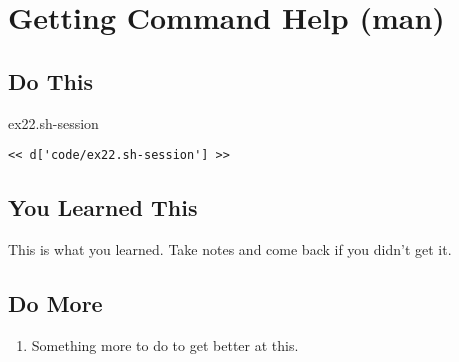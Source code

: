\chapter{Getting Command Help (man)}

\section{Do This}

\begin{code}{ex22.sh-session}
\begin{Verbatim}
<< d['code/ex22.sh-session'] >>
\end{Verbatim}
\end{code}


\section{You Learned This}

This is what you learned.  Take notes and come back if you didn't get it.

\section{Do More}

\begin{enumerate}
\item Something more to do to get better at this.
\end{enumerate}


